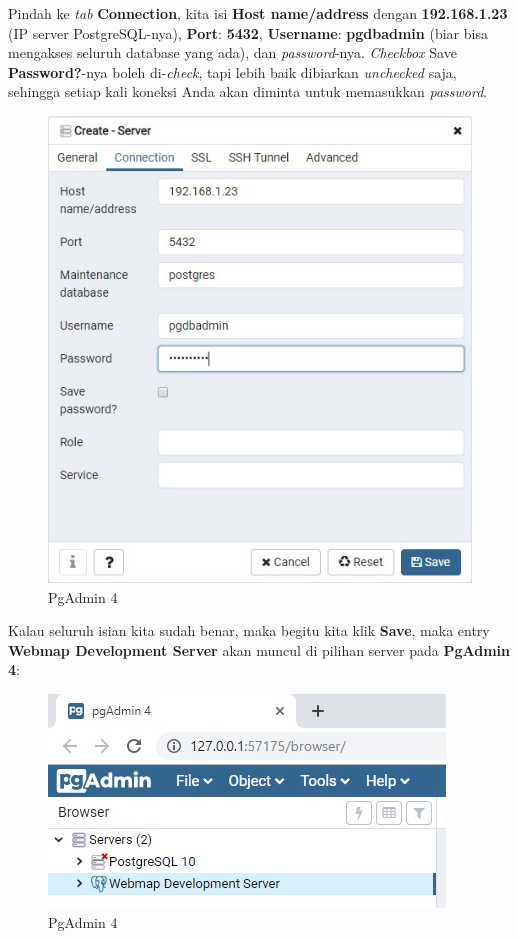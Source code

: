 \documentclass[]{book}
\begin{document}
Pindah ke \emph{tab} \textbf{Connection}, kita isi \textbf{Host name/address} dengan \textbf{192.168.1.23} (IP server PostgreSQL-nya), \textbf{Port}: \textbf{5432}, \textbf{Username}: \textbf{pgdbadmin} (biar bisa mengakses seluruh database yang ada), dan \emph{password}-nya. \emph{Checkbox} Save \textbf{Password?}-nya boleh di-\emph{check}, tapi lebih baik dibiarkan \emph{unchecked} saja, sehingga setiap kali koneksi Anda akan diminta untuk memasukkan \emph{password}.

\begin{figure}
\centering
\includegraphics{./img/pgadmin4-create-connection.jpg}
\caption{PgAdmin 4}
\end{figure}

Kalau seluruh isian kita sudah benar, maka begitu kita klik \textbf{Save}, maka entry \textbf{Webmap Development Server} akan muncul di pilihan server pada \textbf{PgAdmin 4}:

\begin{figure}
\centering
\includegraphics{./img/pgadmin4-connection-created.jpg}
\caption{PgAdmin 4}
\end{figure}
\end{document}
